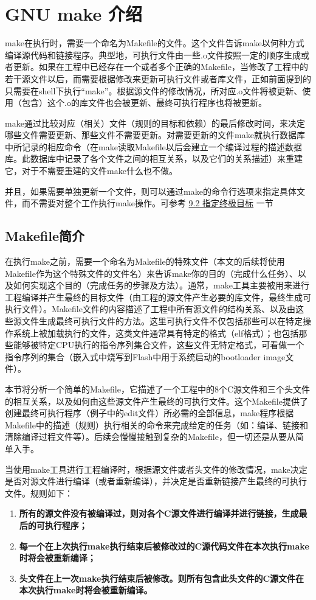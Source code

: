 \chapter{GNU make 介绍}

make在执行时，需要一个命名为Makefile的文件。这个文件告诉make以何种方式编译源代码和链接程序。典型地，可执行文件由一些.o文件按照一定的顺序生成或者更新。如果在工程中已经存在一个或者多个正确的Makefile，当修改了工程中的若干源文件以后，而需要根据修改来更新可执行文件或者库文件，正如前面提到的只需要在shell下执行“make”。根据源文件的修改情况，所对应.o文件将被更新、使用（包含）这个.o的库文件也会被更新、最终可执行程序也将被更新。

make通过比较对应（相关）文件（规则的目标和依赖）的最后修改时间，来决定哪些文件需要更新、那些文件不需要更新。对需要更新的文件make就执行数据库中所记录的相应命令（在make读取Makefile以后会建立一个编译过程的描述数据库。此数据库中记录了各个文件之间的相互关系，以及它们的关系描述）来重建它，对于不需要重建的文件make什么也不做。

并且，如果需要单独更新一个文件，则可以通过make的命令行选项来指定具体文件，而不需要对整个工作执行make操作。可参考 \hyperref[sec:9.2]{9.2 指定终极目标} 一节


\section{Makefile简介}
在执行make之前，需要一个命名为Makefile的特殊文件（本文的后续将使用Makefile作为这个特殊文件的文件名）来告诉make你的目的（完成什么任务）、以及如何实现这个目的（完成任务的步骤及方法）。通常，make工具主要被用来进行工程编译并产生最终的目标文件（由工程的源文件产生必要的库文件，最终生成可执行文件）。Makefile文件的内容描述了工程中所有源文件的结构关系、以及由这些源文件生成最终可执行文件的方法。这里可执行文件不仅包括那些可以在特定操作系统上被加载执行的文件，这类文件通常具有特定的格式（elf格式）；也包括那些能够被特定CPU执行的指令序列集合文件，这些文件无特定格式，可看做一个指令序列的集合（嵌入式中烧写到Flash中用于系统启动的bootloader image文件）。

本节将分析一个简单的Makefile，它描述了一个工程中的8个C源文件和三个头文件的相互关系，以及如何由这些源文件产生最终的可执行文件。这个Makefile提供了创建最终可执行程序（例子中的edit文件）所必需的全部信息，make程序根据Makefile中的描述（规则）执行相关的命令来完成给定的任务（如：编译、链接和清除编译过程文件等）。后续会慢慢接触到复杂的Makefile，但一切还是从要从简单入手。

当使用make工具进行工程编译时，根据源文件或者头文件的修改情况，make决定是否对源文件进行编译（或者重新编译），并决定是否重新链接产生最终的可执行文件。规则如下：
\begin{enumerate}
\itemsep=0pt \parskip=0pt
  \item \textbf{所有的源文件没有被编译过，则对各个C源文件进行编译并进行链接，生成最后的可执行程序；}
  \item \textbf{每一个在上次执行make执行结束后被修改过的C源代码文件在本次执行make时将会被重新编译；}
  \item \textbf{头文件在上一次make执行结束后被修改。则所有包含此头文件的C源文件在本次执行make时将会被重新编译。}
\end{enumerate}


